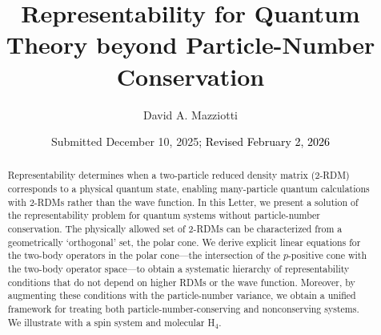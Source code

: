 \documentclass[aps,prl,floatfix,twocolumn,showpacs,10pt]{revtex4-2}
\begin{document}
\title{Representability for Quantum Theory beyond Particle-Number Conservation}

\author{David A. Mazziotti}


\date{Submitted December 10, 2025\textcolor{black}{; Revised February 2, 2026}}




\begin{abstract}
Representability determines when a two-particle reduced density matrix (2-RDM) corresponds to a physical quantum state, enabling many-particle quantum calculations with 2-RDMs rather than the wave function. In this Letter, we present a solution of the representability problem for quantum systems without particle-number conservation. The physically allowed set of 2-RDMs can be characterized from a geometrically `orthogonal' set, the polar cone. We derive explicit linear equations for the two-body operators in the polar cone---the intersection of the $p$-positive cone with the two-body operator space---to obtain a systematic hierarchy of representability conditions that do not depend on higher RDMs or the wave function. Moreover, by augmenting these conditions with the particle-number variance, we obtain a unified framework for treating both particle-number-conserving and nonconserving systems. We illustrate with a spin system and molecular H$_4$.
\end{abstract}



\maketitle
\end{document}
